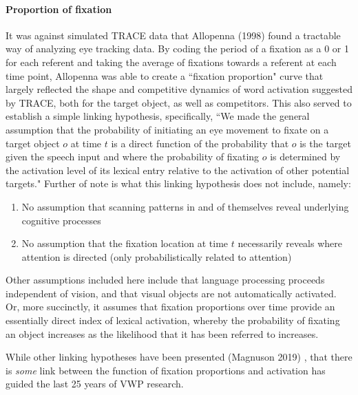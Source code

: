 \documentclass{article}
\begin{document}
\paragraph{Proportion of fixation} It was against simulated TRACE data that Allopenna (1998) found a tractable way of analyzing eye tracking data. By coding the period of a fixation as a 0 or 1 for each referent and taking the average of fixations towards a referent at each time point, Allopenna was able to create a ``fixation proportion" curve that largely reflected the shape and competitive dynamics of word activation suggested by TRACE, both for the target object, as well as competitors. This also served to establish a simple linking hypothesis, specifically, ``We made the general assumption that the probability of initiating an eye movement to fixate on a target object $o$ at time $t$ is a direct function of the probability that $o$ is the target given the speech input and where the probability of fixating $o$ is determined by the activation level of its lexical entry relative to the activation of other potential targets." Further of note is what this linking hypothesis does not include, namely:


\begin{enumerate}
\item No assumption that scanning patterns in and of themselves reveal underlying cognitive processes
\item No assumption that the fixation location at time $t$ necessarily reveals where attention is directed (only probabilistically related to attention)
\end{enumerate}


Other assumptions included here include that language processing proceeds independent of vision, and that visual objects are not automatically activated. Or, more succinctly, it assumes that fixation proportions over time provide an essentially direct index of lexical activation, whereby the probability of fixating an object increases as the likelihood that it has been referred to increases.


While other linking hypotheses have been presented (Magnuson 2019) \cite{Magnuson2019}, that there is \textit{some} link between the function of fixation proportions and activation has guided the last 25 years of VWP research.
\end{document}
